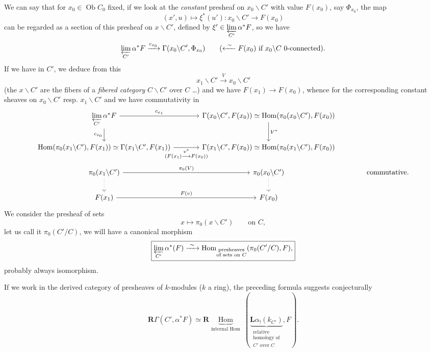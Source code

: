 We can say that for $x_0 \in \operatorname{Ob} C_0$ fixed, if we look at the \textit{constant} presheaf on $x_0\backslash C'$ with value $F(x_0)$, say $\Phi_{x_0}$, the map
\[ (x',u) \longmapsto \xi^*(u') : x_0\backslash C' \longrightarrow F(x_0) \]
can be regarded as a section of this presheaf on $x\backslash C'$, defined by $\xi' \in \varprojlim\limits_{C'} \alpha^*F$, so we have
\[ \varprojlim_{C'} \alpha^*F \xrightarrow{c_{x_0}} \Gamma(x_0\backslash C', \Phi_{x_0}) \qquad (\xleftarrow{\ \sim\ } F(x_0) \text{ if } x_0\backslash C \text{ 0-connected}). \]
If we have  in $C'$, we deduce from this
\[ x_1\backslash C' \xrightarrow{V} x_0\backslash C' \]
(the $x\backslash C'$ are the fibers of a \textit{fibered category} $C\backslash C'$ over $C$ \dots) and we have $F(x_1) \longrightarrow F(x_0)$, whence  for the corresponding constant sheaves on $x_0\backslash C'$ resp. $x_1\backslash C'$
and we have commutativity in
\[
\begin{tikzcd}[column sep=large]
\varprojlim\limits_{C'} \alpha^*F \arrow[r, "c_{x_1}"] \arrow[d, "c_{x_0}"'] & \Gamma(x_0\backslash C', F(x_0)) \simeq \operatorname{Hom}(\pi_0(x_0\backslash C'), F(x_0)) \arrow[d, "V^*"] & \\
\operatorname{Hom}(\pi_0(x_1\backslash C'), F(x_1)) \simeq \Gamma(x_1\backslash C', F(x_1)) \arrow[r, "\substack{v^*\\ (F(x_1) \longrightarrow F(x_0))}"'] & \Gamma(x_1\backslash C', F(x_0)) \simeq \operatorname{Hom}(\pi_0(x_1\backslash C'), F(x_0)) & \\
\pi_0(x_1\backslash C') \arrow[r, "\pi_0(V)"] \arrow[d, dotted] & \pi_0(x_0\backslash C') \arrow[d, dotted] & \text{commutative.} \\
F(x_1) \arrow[r, "F(v)"] & F(x_0) &
\end{tikzcd}
\]
We consider the presheaf of sets
\[ x \longmapsto \pi_0(x\backslash C') \qquad \text{on } C, \]
let us call it $\pi_0(C'/C)$, we will have a canonical morphism
\[ \boxed{\varprojlim_{C'} \alpha^*(F) \xrightarrow{\ \sim\ } \operatorname{Hom}_{\substack{\text{presheaves}\\ \text{of sets on $C$}}} (\pi_0(C'/C), F),} \]
probably always isomorphism.

If we work in the derived category of presheaves of $k$-modules ($k$ a ring), the preceding formula suggests conjecturally
\[ \boxed{\mathbf{R}\Gamma(C', \alpha^*F) \simeq \mathbf{R}\underbrace{\operatorname{Hom}}_{\text{internal Hom}}\ (\underbrace{\mathbf{L}\alpha_!(k_{C'})}_{\substack{\text{relative}\\ \text{homology of}\\ \text{$C'$ over $C$}}}, F).} \]

